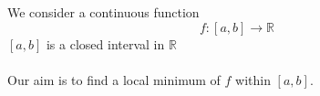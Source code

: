 \documentclass[17pt]{extarticle}
\begin{document}
We consider a continuous function
$$
f: [a,b]\rightarrow \mathbb{R}
$$
$[a,b]$ is a closed interval in $\mathbb{R}$
\\
\\
Our aim is to find a local minimum of $f$ within $[a,b]$.
\end{document}
